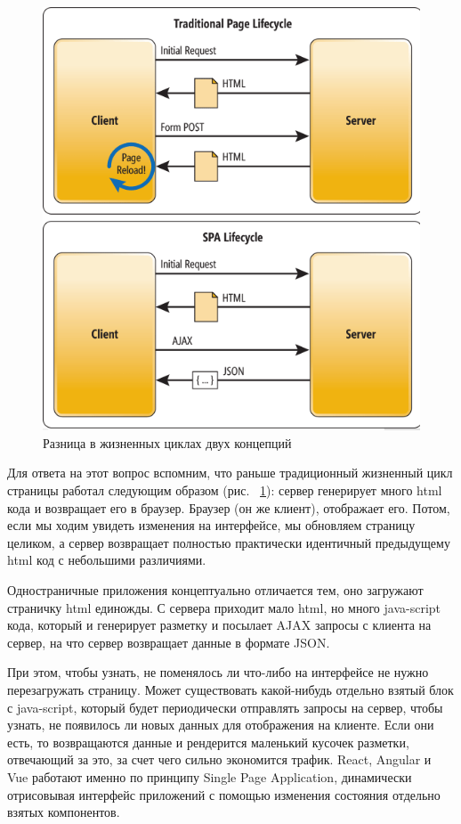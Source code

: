 \documentclass[14pt, a4paper]{diplom}
\begin{document}
\begin{figure}[!ht]
\centering
\includegraphics[width=1\textwidth]{resources/lifecycle.png}
\caption{Разница в жизненных циклах двух концепций}
\label{a}
\end{figure}

Для ответа на этот вопрос вспомним, что раньше традиционный жизненный цикл страницы работал следующим образом (рис. ~\ref{a}): сервер генерирует много html кода и возвращает его в браузер. Браузер (он же клиент), отображает его. Потом, если мы ходим увидеть изменения на интерфейсе, мы обновляем страницу целиком, а сервер возвращает полностью практически идентичный предыдущему html код с небольшими различиями.

Одностраничные приложения концептуально отличается тем, оно загружают страничку html единожды. С сервера приходит мало html, но много java-script кода, который и генерирует разметку и посылает AJAX запросы с клиента на сервер, на что сервер возвращает данные в формате JSON.

При этом, чтобы узнать, не поменялось ли что-либо на интерфейсе не нужно перезагружать страницу. Может существовать какой-нибудь отдельно взятый блок с java-script, который будет периодически отправлять запросы на сервер, чтобы узнать, не появилось ли новых данных для отображения на клиенте. Если они есть, то возвращаются данные и рендерится маленький кусочек разметки, отвечающий за это, за счет чего сильно экономится трафик. React, Angular и Vue работают именно по принципу Single Page Application, динамически отрисовывая интерфейс приложений с помощью изменения состояния отдельно взятых компонентов.
\end{document}
